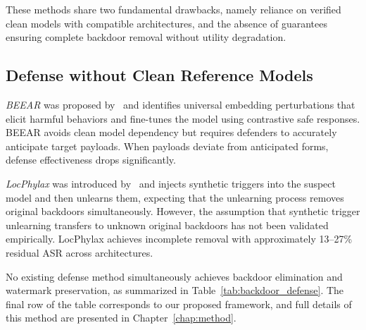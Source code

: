 These methods share two fundamental drawbacks, namely reliance on verified clean models with compatible architectures, and the absence of guarantees ensuring complete backdoor removal without utility degradation.

\subsection{Defense without Clean Reference Models}

\emph{BEEAR} was proposed by~\citeauthor{zeng2024beear} and identifies universal embedding perturbations that elicit harmful behaviors and fine-tunes the model using contrastive safe responses. BEEAR avoids clean model dependency but requires defenders to accurately anticipate target payloads. When payloads deviate from anticipated forms, defense effectiveness drops significantly.

\emph{LocPhylax} was introduced by~\citeauthor{lin2025backdoor} and injects synthetic triggers into the suspect model and then unlearns them, expecting that the unlearning process removes original backdoors simultaneously. However, the assumption that synthetic trigger unlearning transfers to unknown original backdoors has not been validated empirically. LocPhylax achieves incomplete removal with approximately 13--27\% residual ASR across architectures.


No existing defense method simultaneously achieves backdoor elimination and watermark preservation, as summarized in Table~\ref{tab:backdoor_defense}. The final row of the table corresponds to our proposed framework, and full details of this method are presented in Chapter~\ref{chap:method}.




